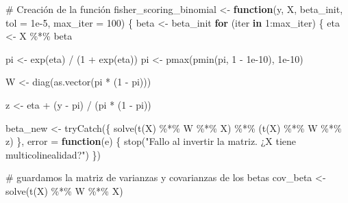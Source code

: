 \documentclass[
  letterpaper,
  DIV=11,
  numbers=noendperiod]{scrartcl}
\newenvironment{Shaded}{\begin{snugshade}}{\end{snugshade}}
\newcommand{\AttributeTok}[1]{\textcolor[rgb]{0.40,0.45,0.13}{#1}}
\newcommand{\CommentTok}[1]{\textcolor[rgb]{0.37,0.37,0.37}{#1}}
\newcommand{\ControlFlowTok}[1]{\textcolor[rgb]{0.00,0.23,0.31}{\textbf{#1}}}
\newcommand{\DecValTok}[1]{\textcolor[rgb]{0.68,0.00,0.00}{#1}}
\newcommand{\FloatTok}[1]{\textcolor[rgb]{0.68,0.00,0.00}{#1}}
\newcommand{\FunctionTok}[1]{\textcolor[rgb]{0.28,0.35,0.67}{#1}}
\newcommand{\NormalTok}[1]{\textcolor[rgb]{0.00,0.23,0.31}{#1}}
\newcommand{\OtherTok}[1]{\textcolor[rgb]{0.00,0.23,0.31}{#1}}
\newcommand{\SpecialCharTok}[1]{\textcolor[rgb]{0.37,0.37,0.37}{#1}}
\newcommand{\StringTok}[1]{\textcolor[rgb]{0.13,0.47,0.30}{#1}}
\begin{document}
\begin{Shaded}
\begin{Highlighting}[]
\CommentTok{\# Creación de la función}
\NormalTok{fisher\_scoring\_binomial }\OtherTok{\textless{}{-}} \ControlFlowTok{function}\NormalTok{(y, X, beta\_init, }\AttributeTok{tol =} \FloatTok{1e{-}5}\NormalTok{, }\AttributeTok{max\_iter =} \DecValTok{100}\NormalTok{) \{}
\NormalTok{  beta }\OtherTok{\textless{}{-}}\NormalTok{ beta\_init}
  \ControlFlowTok{for}\NormalTok{ (iter }\ControlFlowTok{in} \DecValTok{1}\SpecialCharTok{:}\NormalTok{max\_iter) \{}
\NormalTok{    eta }\OtherTok{\textless{}{-}}\NormalTok{ X }\SpecialCharTok{\%*\%}\NormalTok{ beta}
    
\NormalTok{    pi }\OtherTok{\textless{}{-}} \FunctionTok{exp}\NormalTok{(eta) }\SpecialCharTok{/}\NormalTok{ (}\DecValTok{1} \SpecialCharTok{+} \FunctionTok{exp}\NormalTok{(eta))}
\NormalTok{    pi }\OtherTok{\textless{}{-}} \FunctionTok{pmax}\NormalTok{(}\FunctionTok{pmin}\NormalTok{(pi, }\DecValTok{1} \SpecialCharTok{{-}} \FloatTok{1e{-}10}\NormalTok{), }\FloatTok{1e{-}10}\NormalTok{)}
    
\NormalTok{    W }\OtherTok{\textless{}{-}} \FunctionTok{diag}\NormalTok{(}\FunctionTok{as.vector}\NormalTok{(pi }\SpecialCharTok{*}\NormalTok{ (}\DecValTok{1} \SpecialCharTok{{-}}\NormalTok{ pi)))}
    
\NormalTok{    z }\OtherTok{\textless{}{-}}\NormalTok{ eta }\SpecialCharTok{+}\NormalTok{ (y }\SpecialCharTok{{-}}\NormalTok{ pi) }\SpecialCharTok{/}\NormalTok{ (pi }\SpecialCharTok{*}\NormalTok{ (}\DecValTok{1} \SpecialCharTok{{-}}\NormalTok{ pi))}
    
\NormalTok{    beta\_new }\OtherTok{\textless{}{-}} \FunctionTok{tryCatch}\NormalTok{(\{}
      \FunctionTok{solve}\NormalTok{(}\FunctionTok{t}\NormalTok{(X) }\SpecialCharTok{\%*\%}\NormalTok{ W }\SpecialCharTok{\%*\%}\NormalTok{ X) }\SpecialCharTok{\%*\%}\NormalTok{ (}\FunctionTok{t}\NormalTok{(X) }\SpecialCharTok{\%*\%}\NormalTok{ W }\SpecialCharTok{\%*\%}\NormalTok{ z)}
\NormalTok{    \}, }\AttributeTok{error =} \ControlFlowTok{function}\NormalTok{(e) \{}
      \FunctionTok{stop}\NormalTok{(}\StringTok{"Fallo al invertir la matriz. ¿X tiene multicolinealidad?"}\NormalTok{)}
\NormalTok{    \})}
    
    \CommentTok{\# guardamos la matriz de varianzas y covarianzas de los betas}
\NormalTok{    cov\_beta }\OtherTok{\textless{}{-}} \FunctionTok{solve}\NormalTok{(}\FunctionTok{t}\NormalTok{(X) }\SpecialCharTok{\%*\%}\NormalTok{ W }\SpecialCharTok{\%*\%}\NormalTok{ X)}
    

\end{Highlighting}
\end{Shaded}
\end{document}
